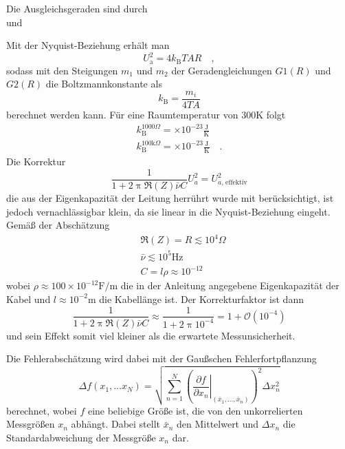 		Die Ausgleichsgeraden sind durch
		\begin{equation}
			
		\end{equation}
		und
		\begin{equation}
			
		\end{equation}
		
		Mit der Nyquist-Beziehung erhält man
		\begin{equation}
			U_\text{a}^2 =4k_\text{B}T A R \quad , 
		\end{equation}
		sodass mit den Steigungen $m_1$ und $m_2$ der Geradengleichungen $G1(R)$ und $G2(R)$ 
		die Boltzmannkonstante als
		\begin{equation}
		k_\text{B}=\frac{m_i}{4 T A}
		\end{equation}
		berechnet werden kann. Für eine Raumtemperatur von $300$K folgt
		\begin{align}
		k_\text{B}^{1000\Omega}			=  \times 10^{-23}\frac{\text{J}}
																			{\text{K}}  \\ 
		k_\text{B}^{100\text{k}\Omega}	=  \times 10^{-23}\frac{\text{J}}
																			{\text{K}} \quad . 
		\end{align}
		Die Korrektur
		\begin{equation}
		\frac{1}{1+2 \uppi \Re(Z) \bar{\nu} C} U_a^2 = U_{a\text{, effektiv}}^2
		\end{equation}
		die aus der Eigenkapazität der Leitung herrührt wurde mit berücksichtigt, ist 
		jedoch vernachlässigbar klein, da 
		sie linear in die Nyquist-Beziehung eingeht. Gemäß der Abschätzung 
		\begin{align}
		&\Re(Z) = R  \lesssim  10^4 \Omega \\
		&\bar{\nu}  \lesssim 10^5 \text{Hz} \\
		&C = l \rho  \approx 10^{-12}
		\end{align}
		wobei $\rho\approx 100 \times 10^{-12} \text{F}/\text{m}$ die in 
		der Anleitung angegebene Eigenkapazität der Kabel 
		und $l\approx 10^{-2}$m die Kabellänge ist. Der Korrekturfaktor ist dann 
		\begin{equation}				
		\frac{1}{1+2 \uppi \Re(Z) \bar{\nu} C} \approx 
		\frac{1}{1+2\uppi 10^{-4}}=1+ \mathcal{O}(10^{-4}) 
		\end{equation}
		und sein Effekt somit viel kleiner als die erwartete Messunsicherheit. 
		
		Die Fehlerabschätzung wird dabei mit der Gaußschen Fehlerfortpflanzung 
		\begin{equation}
		\Delta f(x_1,\ldots x_N) 
		=\sqrt{ \sum_{n=1}^N \left(\left.\frac{\partial f}{\partial x_n}\right|
		_{(\bar{x}_1,\ldots,\bar{x}_n)}\right)^2 
		\Delta x_n ^2 }
		\end{equation}
		berechnet, wobei $f$ eine beliebige Größe ist, die von den unkorrelierten 
		Messgrößen $x_n$ abhängt. Dabei  stellt $\bar{x}_n$ den Mittelwert und 
		$\Delta x_n$ die Standardabweichung der Messgröße $x_n$ dar.
		
